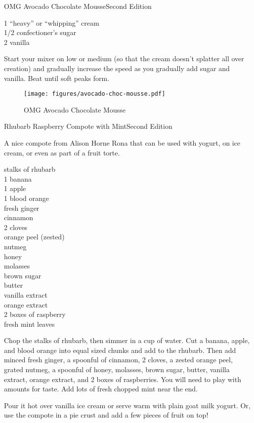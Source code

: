 \begin{entry}{OMG Avocado Chocolate Mousse}{Second Edition}

\begin{ingredients}
    \SI{1}{\quart} ``heavy'' or ``whipping'' cream\\
    \SI{1/2}{\cup} confectioner's sugar\\
    \SI{2}{\teaspoon} vanilla
\end{ingredients}
Start your mixer on low or medium (so that the cream doesn't splatter all over
creation) and gradually increase the speed as you gradually add sugar and
vanilla.  Beat until soft peaks form.
\begin{figure}
    \centering
    \texttt{[image: figures/avocado-choc-mousse.pdf]}
    \caption{OMG Avocado Chocolate Mousse}
    \label{fig:mousse}
\end{figure}
\end{entry}

\begin{entry}{Rhubarb Raspberry Compote with Mint}{Second Edition}

\begin{open}
  A nice compote from Alison Horne Rona that can be used with yogurt, on ice cream,
  or even as part of a fruit torte.
\end{open}
\begin{ingredients}
    stalks of rhubarb\\
    1 banana\\
    1 apple\\
    1 blood orange\\
    fresh ginger\\
    cinnamon\\
    2 cloves\\
    orange peel (zested)\\
    nutmeg\\
    honey\\
    molasses\\
    brown sugar\\
    butter\\
    vanilla extract\\
    orange extract\\
    2 boxes of raspberry\\
    fresh mint leaves
\end{ingredients}
Chop the stalks of rhubarb, then simmer in a cup of water.  Cut a banana,
apple, and blood orange into equal sized chunks and add to the rhubarb.  Then
add minced fresh ginger, a spoonful of cinnamon, 2 cloves, a zested orange peel,
grated nutmeg, a spoonful of honey, molasses, brown sugar, butter, vanilla
extract, orange extract, and 2 boxes of raspberries.  You will need to play with
amounts for taste.  Add lots of fresh chopped mint near the end.

Pour it hot over vanilla ice cream or serve warm with plain goat milk yogurt.
Or, use the compote in a pie crust and add a few pieces of fruit on top!
\end{entry}

